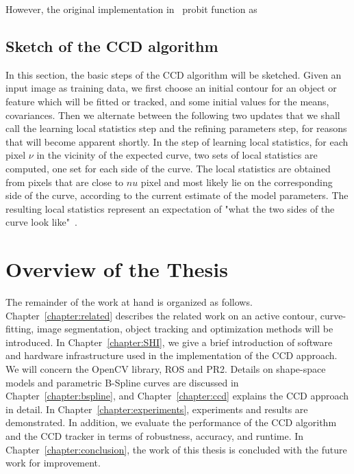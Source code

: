 However, the original implementation in~\cite{hanek2004contracting}
probit function as 

\subsection{Sketch of the CCD algorithm}
\label{sec:sccd}

In this section, the basic steps of the CCD algorithm will be
sketched. Given an input image as training data, we first choose an initial
contour for an object or feature which will be fitted or tracked, and
some initial values for the means, covariances. Then we alternate
between the following two updates that we shall call the learning
local statistics step and the refining parameters step, for reasons
that will become apparent shortly.
In the step of learning local statistics, for each pixel $\nu$ in the
vicinity of the expected curve, two sets of local statistics
are computed, one set for each side of the curve. The local statistics are obtained from
pixels that are close to $nu$ pixel and most likely lie on the corresponding side of the curve,
according to the current estimate of the model parameters. The resulting local statistics
represent an expectation of "what the two sides of the curve look
like"~\cite{hanek2004contracting}.



\section{Overview of the Thesis}
\label{sec:overview}
The remainder of the work at hand is organized as
follows. Chapter~\ref{chapter:related} describes the related work on
an active contour,
curve-fitting, image segmentation, object tracking and optimization methods will be
introduced. In Chapter~\ref{chapter:SHI}, we give a brief introduction of software
and hardware infrastructure used in the implementation of the CCD
approach. We will concern the OpenCV library, ROS and PR2. Details on shape-space models and parametric
B-Spline curves are discussed in Chapter~\ref{chapter:bspline},  and
Chapter~\ref{chapter:ccd} explains the CCD approach in detail. 
In Chapter~\ref{chapter:experiments}, experiments and results are demonstrated. In
addition, we evaluate the performance of the CCD algorithm and the CCD
tracker in terms of robustness, accuracy, and runtime. In Chapter~\ref{chapter:conclusion},
the work of this thesis is concluded with the future work for improvement.



